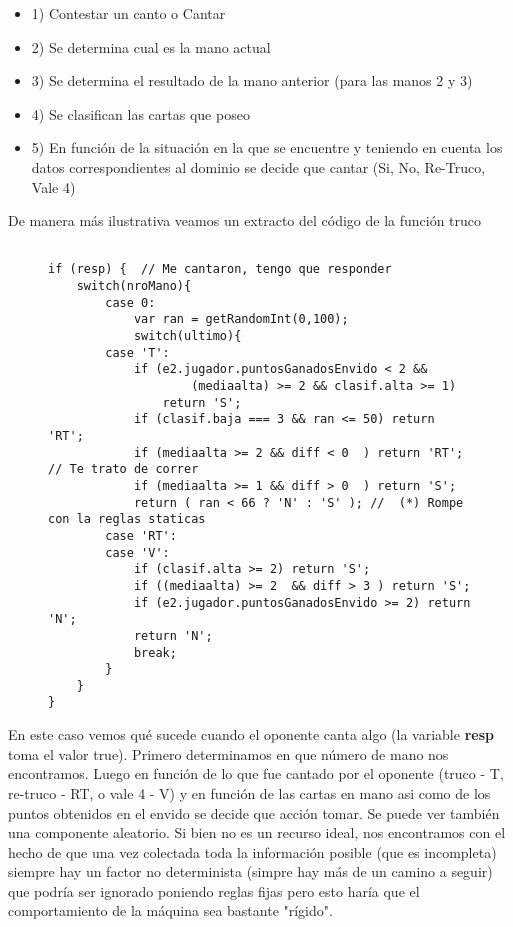 \documentclass[12pt,a4paper]{article}
\begin{document}
\begin{itemize}
\item 1) Contestar un canto o Cantar
\item 2) Se determina cual es la mano actual
\item 3) Se determina el resultado de la mano anterior (para las manos 2 y 3)
\item 4) Se clasifican las cartas que poseo
\item 5) En función de la situación en la que se encuentre y teniendo en cuenta los datos correspondientes al dominio
	   se decide que cantar (Si, No, Re-Truco, Vale 4)
\end{itemize}

De manera m\'as ilustrativa veamos un extracto del c\'odigo de la funci\'on truco
\begin{figure}[h]
\lstset{language=java,caption=Extracto de la funci\'on truco,label=lst:nicecode}
\begin{lstlisting}

if (resp) {  // Me cantaron, tengo que responder
	switch(nroMano){
		case 0:
			var ran = getRandomInt(0,100);
			switch(ultimo){
		case 'T':
			if (e2.jugador.puntosGanadosEnvido < 2 && 
					(mediaalta) >= 2 && clasif.alta >= 1)
				return 'S';
			if (clasif.baja === 3 && ran <= 50) return 'RT'; 
			if (mediaalta >= 2 && diff < 0  ) return 'RT';  // Te trato de correr
			if (mediaalta >= 1 && diff > 0  ) return 'S';
			return ( ran < 66 ? 'N' : 'S' ); //  (*) Rompe con la reglas staticas
		case 'RT':
		case 'V':
			if (clasif.alta >= 2) return 'S';
			if ((mediaalta) >= 2  && diff > 3 ) return 'S';
			if (e2.jugador.puntosGanadosEnvido >= 2) return 'N';
			return 'N';
			break;
		}
	}
}
\end{lstlisting}
\end{figure}



En este caso vemos qu\'e sucede cuando el oponente canta algo (la variable \textbf{resp} toma el valor true). Primero determinamos
en que n\'umero de mano nos encontramos. Luego en funci\'on de lo que fue cantado por el oponente (truco - T, re-truco - RT, o vale 4 - V)
y en funci\'on de las cartas en mano asi como de los puntos obtenidos en el envido se decide que acci\'on tomar. Se puede ver tambi\'en
una componente aleatorio. Si bien no es un recurso ideal, nos encontramos con el hecho de que una vez colectada toda la informaci\'on posible
(que es incompleta) siempre hay un factor no determinista (simpre hay m\'as de un camino a seguir)
que podr\'ia ser ignorado poniendo reglas fijas pero esto har\'ia que el comportamiento de la m\'aquina sea bastante "r\'igido".
\end{document}
